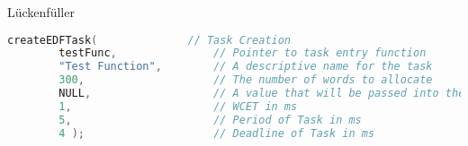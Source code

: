 \documentclass[../EDF Master Thesis.tex]{subfiles}
\begin{document}
    Lückenfüller

\begin{lstlisting}[language=C, caption=FreeRTOS Task creation and deletion, label=code:freertos_task_creation]
    createEDFTask(              // Task Creation
        testFunc,               // Pointer to task entry function
        "Test Function",        // A descriptive name for the task
        300,                    // The number of words to allocate
        NULL,                   // A value that will be passed into the task 
        1,                      // WCET in ms
        5,                      // Period of Task in ms
        4 );                    // Deadline of Task in ms
\end{lstlisting}
\end{document}
